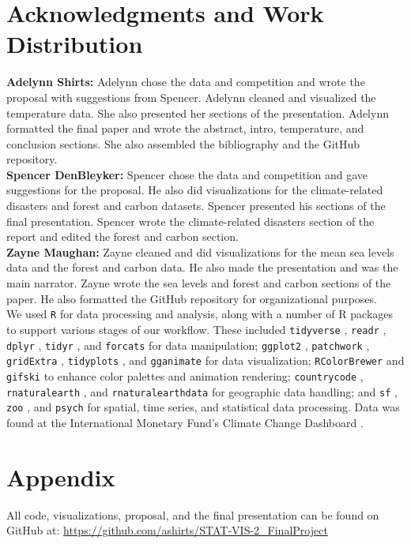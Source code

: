 \documentclass[10pt]{article}
\begin{document}
\section{Acknowledgments and Work Distribution}  
\label{acknowledgments}
\textbf{Adelynn Shirts:} Adelynn chose the data and competition and wrote the proposal with suggestions from Spencer. Adelynn cleaned and visualized the temperature data. She also presented her sections of the presentation. Adelynn formatted the final paper and wrote the abstract, intro, temperature, and conclusion sections. She also assembled the bibliography and the GitHub repository.\\
\textbf{Spencer DenBleyker:}  Spencer chose the data and competition and gave suggestions for the proposal. He also did visualizations for the climate-related disasters and forest and carbon datasets. Spencer presented his sections of the final presentation. Spencer wrote the climate-related disasters section of the report and edited the forest and carbon section.\\
\textbf{Zayne Maughan:} Zayne cleaned and did visualizations for the mean sea levels data and the forest and carbon data. He also made the presentation and was the main narrator. Zayne wrote the sea levels and forest and carbon sections of the paper. He also formatted the GitHub repository for organizational purposes. \\



We used \texttt{R} \parencite{R-base} for data processing and analysis, along with a number of R packages to support various stages of our workflow. These included \texttt{tidyverse} \parencite{tidyverse}, \texttt{readr} \parencite{readr}, \texttt{dplyr} \parencite{dplyr}, \texttt{tidyr} \parencite{tidyr}, and \texttt{forcats} \parencite{forcats} for data manipulation; \texttt{ggplot2} \parencite{ggplot2}, \texttt{patchwork} \parencite{patchwork}, \texttt{gridExtra} \parencite{gridExtra}, \texttt{tidyplots} \parencite{tidyplots}, and \texttt{gganimate} \parencite{gganimate} for data visualization; \texttt{RColorBrewer} \parencite{RColorBrewer} and \texttt{gifski} \parencite{gifski} to enhance color palettes and animation rendering; \texttt{countrycode} \parencite{countrycode}, \texttt{rnaturalearth} \parencite{rnaturalearth}, and \texttt{rnaturalearthdata} \parencite{rnaturalearthdata} for geographic data handling; and \texttt{sf} \parencite{Pebesma2023,Pebesma2018}, \texttt{zoo} \parencite{zoo}, and \texttt{psych} \parencite{psych} for spatial, time series, and statistical data processing. Data was found at the International Monetary Fund's Climate Change Dashboard \parencite{IMFClimateData}.



\printbibliography


\newpage
\section*{Appendix}
All code, visualizations, proposal, and the final presentation can be found on GitHub at: \url{https://github.com/ashirts/STAT-VIS-2_FinalProject} 
\end{document}
